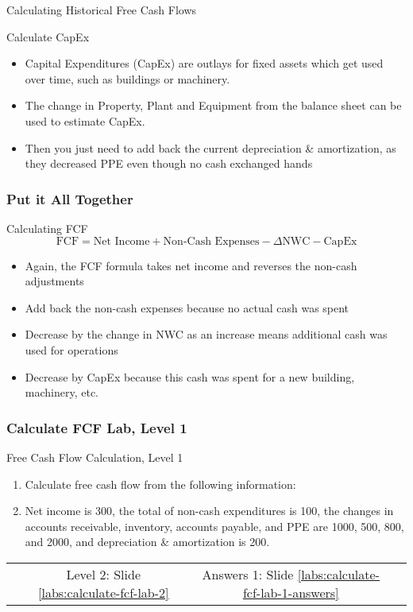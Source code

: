 \documentclass[handout, 11pt]{beamer}
\begin{document}
\begin{section}{Calculating Historical Free Cash Flows}
\begin{frame}
\begin{block}{Calculate CapEx}
\end{block}
\vfill
\begin{itemize}
\item Capital Expenditures (CapEx) are outlays for fixed assets which get used over time, such as buildings or machinery.
\vfill
\item The change in Property, Plant and Equipment from the balance sheet can be used to estimate CapEx.
\vfill
\item Then you just need to add back the current depreciation \& amortization, as they decreased PPE even though no cash exchanged hands
\end{itemize}
\end{frame}
\begin{frame}
\frametitle{Put it All Together}
\begin{block}{Calculating FCF}
\begin{equation}
	\text{FCF} = \text{Net Income} + \text{Non-Cash Expenses} - \Delta\text{NWC} - \text{CapEx}
\end{equation}
\end{block}
\vfill
\begin{itemize}
\item Again, the FCF formula takes net income and reverses the non-cash adjustments
\vfill
\item Add back the non-cash expenses because no actual cash was spent
\vfill
\item Decrease by the change in NWC as an increase means additional cash was used for operations
\vfill
\item Decrease by CapEx because this cash was spent for a new building, machinery, etc.
\end{itemize}
\end{frame}
\begin{frame}
\frametitle{Calculate FCF Lab, Level 1}
{
\begin{block}{Free Cash Flow Calculation, Level 1}
\begin{enumerate}
\item Calculate free cash flow from the following information:
\item Net income is 300, the total of non-cash expenditures is 100, the changes in accounts receivable, inventory, accounts payable, and PPE are 1000, 500, 800, and 2000, and depreciation \& amortization is 200.
\end{enumerate}
\vfill
\begin{tabular*}{\textwidth}{@{\extracolsep{\fill}}cccc}
\toprule
\hfill & Level 2: Slide \textcolor{blue}{\underline{\ref{labs:calculate-fcf-lab-2}}} & Answers 1: Slide \textcolor{blue}{\underline{\ref{labs:calculate-fcf-lab-1-answers}}} & \hfill\\


\end{tabular*}
\end{block}}
\end{frame}
\end{section}
\end{document}
